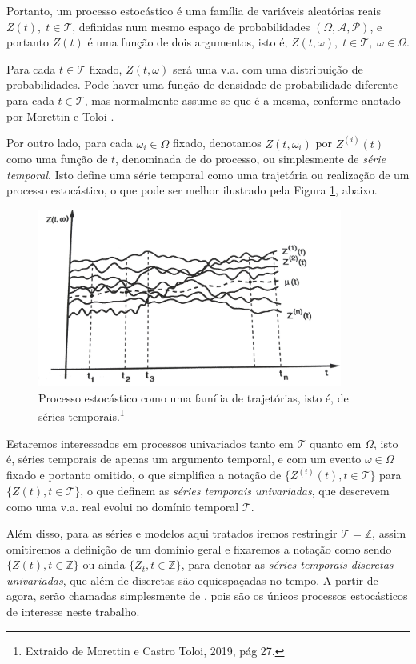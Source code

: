 Portanto, um processo estocástico é uma família de variáveis aleatórias reais $Z(t),\; t \in \mathcal{T}$, definidas num mesmo espaço de probabilidades $(\Omega, \mathcal{A}, \mathcal{P})$, e portanto $Z(t)$ é uma função de dois argumentos, isto é, $Z(t, \omega),\; t \in \mathcal{T},\; \omega \in \Omega$.

Para cada $t \in \mathcal{T}$ fixado, $Z(t, \omega)$ será uma v.a. com uma distribuição de probabilidades. Pode haver uma função de densidade de probabilidade diferente para cada $t \in \mathcal{T}$, mas normalmente assume-se que é a mesma, conforme anotado por Morettin e Toloi \citep{morettin}.

Por outro lado, para cada $\omega_i \in \Omega$ fixado, denotamos $Z(t, \omega_i)$ por $Z^{(i)}(t)$ como uma função de $t$, denominada de  do processo, ou simplesmente de \emph{série temporal}. Isto define uma série temporal como uma trajetória ou realização de um processo estocástico, o que pode ser melhor ilustrado pela Figura \ref{fig:trajetorias}, abaixo.

\begin{figure}[htb]
\centering
\includegraphics[width=10cm]{figuras/trajetorias}
\caption{Processo estocástico como uma família de trajetórias, isto é, de séries temporais.\footnote{Extraido de Morettin e Castro Toloi, 2019, pág 27.}}
\label{fig:trajetorias}
\end{figure}

Estaremos interessados em processos univariados tanto em $\mathcal{T}$ quanto em $\Omega$, isto é, séries temporais de apenas um argumento temporal, e com um evento $\omega \in \Omega$ fixado e portanto omitido, o que simplifica a notação de $\{Z^{(i)}(t), t \in \mathcal{T}\}$ para $\{Z(t), t \in \mathcal{T}\}$, o que definem as \emph{séries temporais univariadas}, que descrevem como uma v.a. real evolui no domínio temporal $\mathcal{T}$.

Além disso, para as séries e modelos aqui tratados iremos restringir $\mathcal{T} = \mathbb{Z}$, assim omitiremos a definição de um domínio geral e fixaremos a notação como sendo $\{Z(t), t \in \mathbb{Z}\}$ ou ainda $\{Z_t, t \in \mathbb{Z}\}$, para denotar as \emph{séries temporais discretas univariadas}, que além de discretas são equiespaçadas no tempo. A partir de agora, serão chamadas simplesmente de , pois são os únicos processos estocásticos de interesse neste trabalho.

